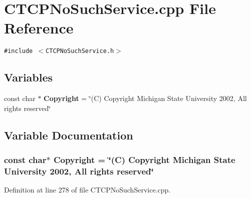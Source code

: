 \section{CTCPNo\-Such\-Service.cpp File Reference}
\label{CTCPNoSuchService_8cpp}
{\tt \#include $<$CTCPNo\-Such\-Service.h$>$}\par
\subsection*{Variables}
\begin{CompactItemize}
\item 
const char $\ast$ {\bf Copyright} = \char`\"{}(C) Copyright Michigan State University 2002, All rights reserved\char`\"{}
\end{CompactItemize}


\subsection{Variable Documentation}
\subsubsection{\setlength{\rightskip}{0pt plus 5cm}const char$\ast$ Copyright = \char`\"{}(C) Copyright Michigan State University 2002, All rights reserved\char`\"{}\hspace{0.3cm}{\tt  [static]}}\label{CTCPNoSuchService_8cpp_a0}




Definition at line 278 of file CTCPNo\-Such\-Service.cpp.